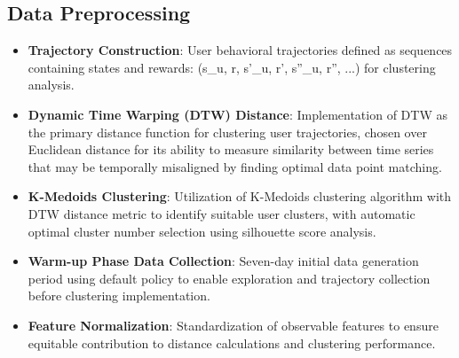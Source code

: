 \subsection*{Data Preprocessing}
\begin{itemize}
    \item \textbf{Trajectory Construction}: User behavioral trajectories defined as sequences containing states and rewards: (s\_u, r, s'\_u, r', s''\_u, r'', ...) for clustering analysis.
    \item \textbf{Dynamic Time Warping (DTW) Distance}: Implementation of DTW as the primary distance function for clustering user trajectories, chosen over Euclidean distance for its ability to measure similarity between time series that may be temporally misaligned by finding optimal data point matching.
    \item \textbf{K-Medoids Clustering}: Utilization of K-Medoids clustering algorithm with DTW distance metric to identify suitable user clusters, with automatic optimal cluster number selection using silhouette score analysis.
    \item \textbf{Warm-up Phase Data Collection}: Seven-day initial data generation period using default policy to enable exploration and trajectory collection before clustering implementation.
    \item \textbf{Feature Normalization}: Standardization of observable features to ensure equitable contribution to distance calculations and clustering performance.
\end{itemize}

